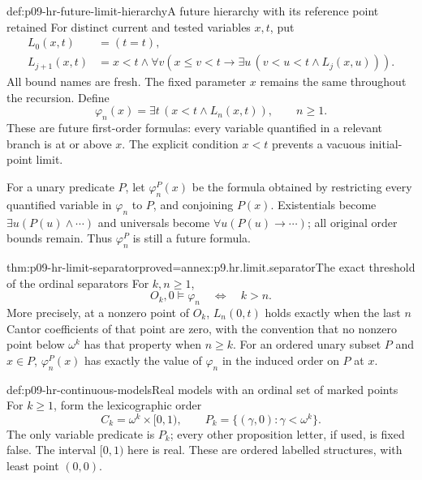 \begin{hbdefinition}{def:p09-hr-future-limit-hierarchy}{A future hierarchy with its reference point retained}
For distinct current and tested variables \(x,t\), put
\[
\begin{aligned}
 L_0(x,t)&=(t=t),\\
 L_{j+1}(x,t)&=
 x<t\land
 \forall v\left(x\leq v<t\longrightarrow
       \exists u\,(v<u<t\land L_j(x,u))\right).
\end{aligned}
\]
All bound names are fresh. The fixed parameter \(x\) remains
the same throughout the recursion. Define
\[
                         \varphi_n(x)=\exists t\,(x<t\land L_n(x,t)),
                         \qquad n\geq1.
\]
These are future first-order formulas: every variable quantified
in a relevant branch is at or above \(x\). The explicit
condition \(x<t\) prevents a vacuous initial-point limit.

For a unary predicate \(P\), let \(\varphi_n^P(x)\) be
the formula obtained by restricting every quantified variable
in \(\varphi_n\) to \(P\), and conjoining \(P(x)\).
Existentials become \(\exists u(P(u)\land\cdots)\)
and universals become \(\forall u(P(u)\to\cdots)\);
all original order bounds remain. Thus
\(\varphi_n^P\) is still a future formula.
\end{hbdefinition}

\begin{hblemma}{thm:p09-hr-limit-separator}{proved=annex:p9.hr.limit.separator}{The exact threshold of the ordinal separators}
For \(k,n\geq1\),
\[
                         O_k,0\models\varphi_n
                                  \quad\Longleftrightarrow\quad k>n.
\]
More precisely, at a nonzero point of \(O_k\), \(L_n(0,t)\)
holds exactly when the last \(n\) Cantor coefficients of
that point are zero, with the convention that no nonzero
point below \(\omega^k\) has that property when \(n\geq k\).
For an ordered unary subset \(P\) and \(x\in P\),
\(\varphi_n^P(x)\) has exactly the value of \(\varphi_n\)
in the induced order on \(P\) at \(x\).
\end{hblemma}

\begin{hbdefinition}{def:p09-hr-continuous-models}{Real models with an ordinal set of marked points}
For \(k\geq1\), form the lexicographic order
\[
                C_k=\omega^k\times[0,1),\qquad
                P_k=\{(\gamma,0):\gamma<\omega^k\}.
\]
The only variable predicate is \(P_k\); every other proposition
letter, if used, is fixed false. The interval \([0,1)\)
here is real. These are ordered labelled structures, with
least point \((0,0)\).
\end{hbdefinition}

